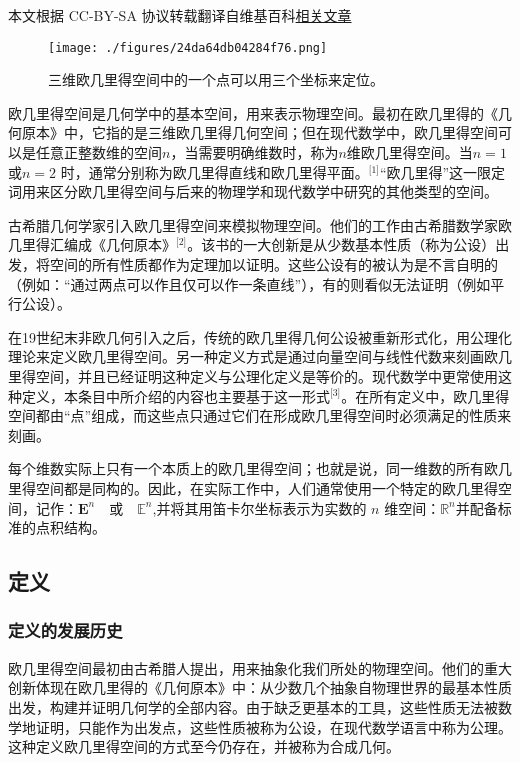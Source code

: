 
本文根据 CC-BY-SA 协议转载翻译自维基百科\href{https://en.wikipedia.org/wiki/Euclidean_space}{相关文章}

\begin{figure}[ht]
\centering
\texttt{[image: ./figures/24da64db04284f76.png]}
\caption{三维欧几里得空间中的一个点可以用三个坐标来定位。} \label{fig_OJLDkj_1}
\end{figure}
欧几里得空间是几何学中的基本空间，用来表示物理空间。最初在欧几里得的《几何原本》中，它指的是三维欧几里得几何空间；但在现代数学中，欧几里得空间可以是任意正整数维的空间$n$，当需要明确维数时，称为$n$维欧几里得空间。当$n=1$或$n=2$ 时，通常分别称为欧几里得直线和欧几里得平面。\(^\text{[1]}\)“欧几里得”这一限定词用来区分欧几里得空间与后来的物理学和现代数学中研究的其他类型的空间。

古希腊几何学家引入欧几里得空间来模拟物理空间。他们的工作由古希腊数学家欧几里得汇编成《几何原本》\(^\text{[2]}\)。该书的一大创新是从少数基本性质（称为公设）出发，将空间的所有性质都作为定理加以证明。这些公设有的被认为是不言自明的（例如：“通过两点可以作且仅可以作一条直线”），有的则看似无法证明（例如平行公设）。

在19世纪末非欧几何引入之后，传统的欧几里得几何公设被重新形式化，用公理化理论来定义欧几里得空间。另一种定义方式是通过向量空间与线性代数来刻画欧几里得空间，并且已经证明这种定义与公理化定义是等价的。现代数学中更常使用这种定义，本条目中所介绍的内容也主要基于这一形式\(^\text{[3]}\)。在所有定义中，欧几里得空间都由“点”组成，而这些点只通过它们在形成欧几里得空间时必须满足的性质来刻画。

每个维数实际上只有一个本质上的欧几里得空间；也就是说，同一维数的所有欧几里得空间都是同构的。因此，在实际工作中，人们通常使用一个特定的欧几里得空间，记作：$\mathbf{E}^n \quad \text{或} \quad \mathbb{E}^n$,并将其用笛卡尔坐标表示为实数的 $n$ 维空间：$\mathbb{R}^n$并配备标准的点积结构。
\subsection{定义}
\subsubsection{定义的发展历史}
欧几里得空间最初由古希腊人提出，用来抽象化我们所处的物理空间。他们的重大创新体现在欧几里得的《几何原本》中：从少数几个抽象自物理世界的最基本性质出发，构建并证明几何学的全部内容。由于缺乏更基本的工具，这些性质无法被数学地证明，只能作为出发点，这些性质被称为公设，在现代数学语言中称为公理。这种定义欧几里得空间的方式至今仍存在，并被称为合成几何。

